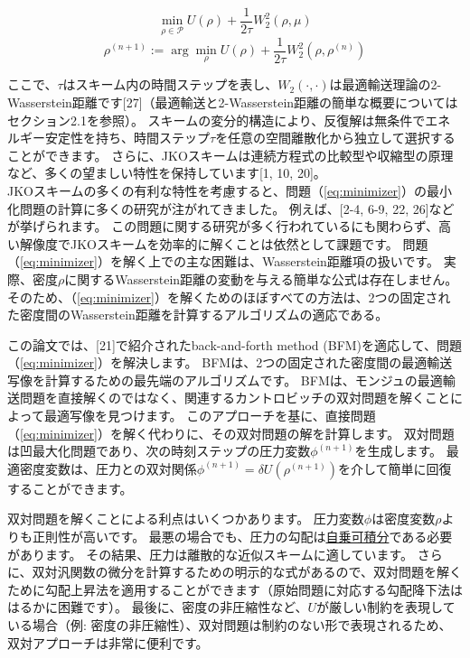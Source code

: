 \documentclass{jsarticle}
\theoremstyle{definition}
\begin{document}
\begin{equation}
    \label{eq:minimizer}
    \min_{\rho \in \mathcal{P}} U(\rho) + \frac{1}{2\tau} W_2^2(\rho, \mu)
\end{equation}
\[
    \rho^{(n+1)} := \arg\min_{\rho} U(\rho) + \frac{1}{2\tau} W_2^2(\rho, \rho^{(n)})
\]

ここで、$\tau$はスキーム内の時間ステップを表し、$W_2(\cdot, \cdot)$は最適輸送理論の2-Wasserstein距離です[27]（最適輸送と2-Wasserstein距離の簡単な概要についてはセクション2.1を参照）。
{\color{teal}スキームの変分的構造により、}反復解は無条件でエネルギー安定性を持ち、時間ステップ$\tau$を任意の空間離散化から独立して選択することができます。
さらに、JKOスキームは連続方程式の比較型や収縮型の原理など、多くの望ましい特性を保持しています[1, 10, 20]。\\

JKOスキームの多くの有利な特性を考慮すると、問題（\ref{eq:minimizer}）の最小化問題の計算に多くの研究が注がれてきました。
例えば、[2-4, 6-9, 22, 26]などが挙げられます。
この問題に関する研究が多く行われているにも関わらず、高い解像度でJKOスキームを効率的に解くことは依然として課題です。
{\color{red}
問題（\ref{eq:minimizer}）を解く上での主な困難は、Wasserstein距離項の扱いです。
実際、密度$\rho$に関するWasserstein距離の変動を与える簡単な公式は存在しません。
そのため、（\ref{eq:minimizer}）を解くためのほぼすべての方法は、2つの固定された密度間のWasserstein距離を計算するアルゴリズムの適応である。\\
}

この論文では、[21]で紹介されたback-and-forth method (BFM)を適応して、問題（\ref{eq:minimizer}）を解決します。
BFMは、2つの固定された密度間の最適輸送写像を計算するための最先端のアルゴリズムです。
{\color{red}
BFMは、モンジュの最適輸送問題を直接解くのではなく、関連するカントロビッチの双対問題を解くことによって最適写像を見つけます。
このアプローチを基に、直接問題（\ref{eq:minimizer}）を解く代わりに、その双対問題の解を計算します。
双対問題は凹最大化問題であり、次の時刻ステップの圧力変数$\phi^{(n + 1)}$を生成します。
最適密度変数は、圧力との双対関係$\phi^{(n+1)} = \delta U(\rho^{(n+1)})$を介して簡単に回復することができます。\\
}

双対問題を解くことによる利点はいくつかあります。
圧力変数$\phi$は密度変数$\rho$よりも正則性が高いです。
最悪の場合でも、圧力の勾配は\hyperlink{自乗可積分}{自乗可積分}である必要があります。
その結果、圧力は離散的な近似スキームに適しています。
さらに、双対汎関数の微分を計算するための明示的な式があるので、双対問題を解くために勾配上昇法を適用することができます（原始問題に対応する勾配降下法ははるかに困難です）。
最後に、密度の非圧縮性など、$U$が厳しい制約を表現している場合（例: 密度の非圧縮性）、双対問題は制約のない形で表現されるため、双対アプローチは非常に便利です。\\
\end{document}
